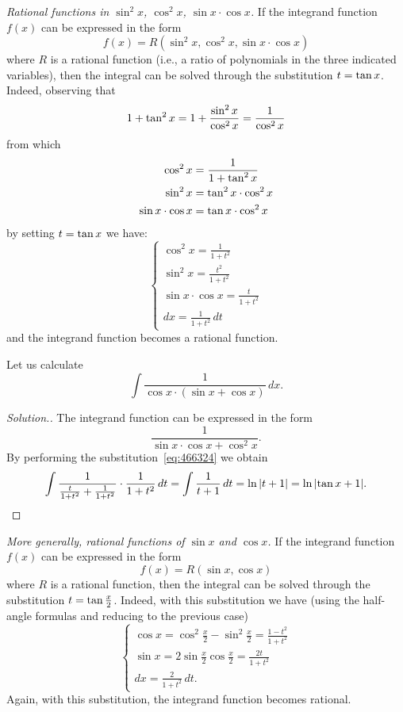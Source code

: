 \emph{Rational functions in $\sin^2 x$, $\cos^2 x$, $\sin x \cdot \cos x$.}
If the integrand function $f(x)$ can be expressed in the form
\[
  f(x) = R(\sin^2 x, \cos^2 x, \sin x \cdot \cos x)
\]
where $R$ is a rational function (i.e., a ratio of polynomials in the three
indicated variables),
then the integral can be solved through the substitution $t=\operatorname{tan} x$. Indeed,
observing that
\[
  1 + \operatorname{tan}^2 x = 1 + \frac{\sin^2 x}{\cos^2 x} = \frac{1}{\cos^2 x}
\]
from which
\begin{align*}
\cos^2 x &= \frac{1}{1+\operatorname{tan}^2 x}\\
\sin^2 x &= \operatorname{tan}^2 x \cdot\cos^2 x\\
\sin x \cdot \cos x &= \operatorname{tan} x \cdot \cos^2 x
\end{align*}
by setting $t = \operatorname{tan} x$ we have:
\begin{equation}\label{eq:466324}
\begin{cases}
  \cos^2 x = \frac{1}{1+t^2}\\
  \sin^2 x = \frac{t^2}{1+t^2}\\
  \sin x \cdot \cos x = \frac{t}{1+t^2}\\
  dx = \frac{1}{1+t^2}\, dt
\end{cases}
\end{equation}
and the integrand function becomes a rational function.

\begin{example}
\label{ex:35663}
Let us calculate
\[
  \int \frac{1}{\cos x \cdot ( \sin x + \cos x)}\, dx.
\]
\end{example}
\begin{proof}[Solution.]
The integrand function can be expressed in the form
\[
  \frac{1}{\sin x \cdot \cos x + \cos^2x}.
\]
By performing the substitution~\eqref{eq:466324}
we obtain
\[
  \int \frac{1}{\frac t {1+t^2} + \frac{1}{1+t^2}}\cdot \frac{1}{1+t^2}\, dt
  = \int \frac{1}{t+1}\, dt = \ln {\left|t+1\right|} = \ln {\left|\operatorname{tan}x + 1\right|}.
\]
\end{proof}

\emph{More generally, rational functions of $\sin x$ and $\cos x$.}
If the integrand function $f(x)$ can be expressed in the form
\[
  f(x) = R(\sin x, \cos x)
\]
where $R$ is a rational function, then the integral can be solved
through the substitution $t=\operatorname{tan} \frac{x}{2}$. Indeed, with this substitution we
have
(using the half-angle formulas and reducing to the previous case)
\begin{equation}\label{eq:3675323}
  \begin{cases}
    \cos x = \cos^2 \frac x 2 - \sin^2 \frac x 2 = \frac{1-t^2}{1+t^2} \\
    \sin x = 2 \sin \frac x 2 \cos \frac x 2 = \frac{2t}{1+t^2}\\
    dx = \frac{2}{1+t^2}\, dt.
  \end{cases}
\end{equation}
Again, with this substitution, the integrand function becomes rational.

